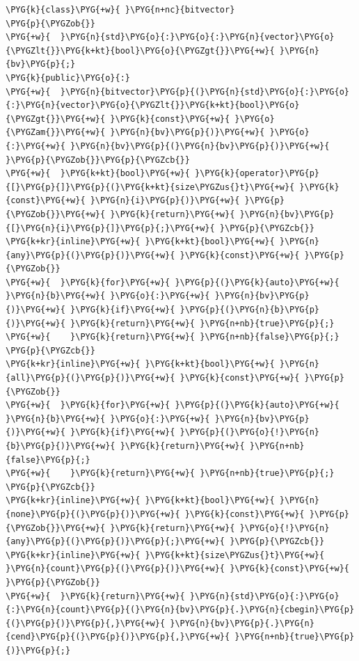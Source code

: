 \begin{codeblockbg}
\begin{Verbatim}[commandchars=\\\{\},breaklines=true,breakanywhere=true,fontsize=\codefont,xleftmargin=17bp]
\PYG{k}{class}\PYG{+w}{ }\PYG{n+nc}{bitvector}
\PYG{p}{\PYGZob{}}
\PYG{+w}{  }\PYG{n}{std}\PYG{o}{:}\PYG{o}{:}\PYG{n}{vector}\PYG{o}{\PYGZlt{}}\PYG{k+kt}{bool}\PYG{o}{\PYGZgt{}}\PYG{+w}{ }\PYG{n}{bv}\PYG{p}{;}
\PYG{k}{public}\PYG{o}{:}
\PYG{+w}{  }\PYG{n}{bitvector}\PYG{p}{(}\PYG{n}{std}\PYG{o}{:}\PYG{o}{:}\PYG{n}{vector}\PYG{o}{\PYGZlt{}}\PYG{k+kt}{bool}\PYG{o}{\PYGZgt{}}\PYG{+w}{ }\PYG{k}{const}\PYG{+w}{ }\PYG{o}{\PYGZam{}}\PYG{+w}{ }\PYG{n}{bv}\PYG{p}{)}\PYG{+w}{ }\PYG{o}{:}\PYG{+w}{ }\PYG{n}{bv}\PYG{p}{(}\PYG{n}{bv}\PYG{p}{)}\PYG{+w}{ }\PYG{p}{\PYGZob{}}\PYG{p}{\PYGZcb{}}
\PYG{+w}{  }\PYG{k+kt}{bool}\PYG{+w}{ }\PYG{k}{operator}\PYG{p}{[}\PYG{p}{]}\PYG{p}{(}\PYG{k+kt}{size\PYGZus{}t}\PYG{+w}{ }\PYG{k}{const}\PYG{+w}{ }\PYG{n}{i}\PYG{p}{)}\PYG{+w}{ }\PYG{p}{\PYGZob{}}\PYG{+w}{ }\PYG{k}{return}\PYG{+w}{ }\PYG{n}{bv}\PYG{p}{[}\PYG{n}{i}\PYG{p}{]}\PYG{p}{;}\PYG{+w}{ }\PYG{p}{\PYGZcb{}}
\PYG{k+kr}{inline}\PYG{+w}{ }\PYG{k+kt}{bool}\PYG{+w}{ }\PYG{n}{any}\PYG{p}{(}\PYG{p}{)}\PYG{+w}{ }\PYG{k}{const}\PYG{+w}{ }\PYG{p}{\PYGZob{}}
\PYG{+w}{  }\PYG{k}{for}\PYG{+w}{ }\PYG{p}{(}\PYG{k}{auto}\PYG{+w}{ }\PYG{n}{b}\PYG{+w}{ }\PYG{o}{:}\PYG{+w}{ }\PYG{n}{bv}\PYG{p}{)}\PYG{+w}{ }\PYG{k}{if}\PYG{+w}{ }\PYG{p}{(}\PYG{n}{b}\PYG{p}{)}\PYG{+w}{ }\PYG{k}{return}\PYG{+w}{ }\PYG{n+nb}{true}\PYG{p}{;}
\PYG{+w}{    }\PYG{k}{return}\PYG{+w}{ }\PYG{n+nb}{false}\PYG{p}{;}
\PYG{p}{\PYGZcb{}}
\PYG{k+kr}{inline}\PYG{+w}{ }\PYG{k+kt}{bool}\PYG{+w}{ }\PYG{n}{all}\PYG{p}{(}\PYG{p}{)}\PYG{+w}{ }\PYG{k}{const}\PYG{+w}{ }\PYG{p}{\PYGZob{}}
\PYG{+w}{  }\PYG{k}{for}\PYG{+w}{ }\PYG{p}{(}\PYG{k}{auto}\PYG{+w}{ }\PYG{n}{b}\PYG{+w}{ }\PYG{o}{:}\PYG{+w}{ }\PYG{n}{bv}\PYG{p}{)}\PYG{+w}{ }\PYG{k}{if}\PYG{+w}{ }\PYG{p}{(}\PYG{o}{!}\PYG{n}{b}\PYG{p}{)}\PYG{+w}{ }\PYG{k}{return}\PYG{+w}{ }\PYG{n+nb}{false}\PYG{p}{;}
\PYG{+w}{    }\PYG{k}{return}\PYG{+w}{ }\PYG{n+nb}{true}\PYG{p}{;}
\PYG{p}{\PYGZcb{}}
\PYG{k+kr}{inline}\PYG{+w}{ }\PYG{k+kt}{bool}\PYG{+w}{ }\PYG{n}{none}\PYG{p}{(}\PYG{p}{)}\PYG{+w}{ }\PYG{k}{const}\PYG{+w}{ }\PYG{p}{\PYGZob{}}\PYG{+w}{ }\PYG{k}{return}\PYG{+w}{ }\PYG{o}{!}\PYG{n}{any}\PYG{p}{(}\PYG{p}{)}\PYG{p}{;}\PYG{+w}{ }\PYG{p}{\PYGZcb{}}
\PYG{k+kr}{inline}\PYG{+w}{ }\PYG{k+kt}{size\PYGZus{}t}\PYG{+w}{ }\PYG{n}{count}\PYG{p}{(}\PYG{p}{)}\PYG{+w}{ }\PYG{k}{const}\PYG{+w}{ }\PYG{p}{\PYGZob{}}
\PYG{+w}{  }\PYG{k}{return}\PYG{+w}{ }\PYG{n}{std}\PYG{o}{:}\PYG{o}{:}\PYG{n}{count}\PYG{p}{(}\PYG{n}{bv}\PYG{p}{.}\PYG{n}{cbegin}\PYG{p}{(}\PYG{p}{)}\PYG{p}{,}\PYG{+w}{ }\PYG{n}{bv}\PYG{p}{.}\PYG{n}{cend}\PYG{p}{(}\PYG{p}{)}\PYG{p}{,}\PYG{+w}{ }\PYG{n+nb}{true}\PYG{p}{)}\PYG{p}{;}

\end{Verbatim}
\end{codeblockbg}
